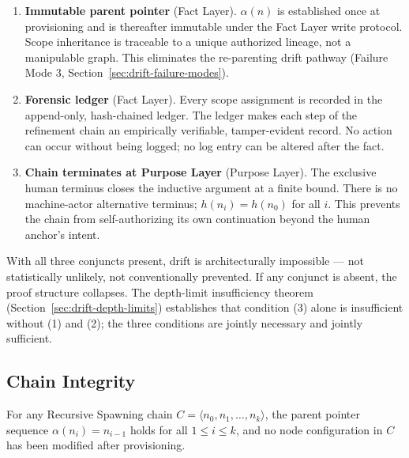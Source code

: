 \begin{enumerate}
    \item[(1)] \textbf{Immutable parent pointer} (Fact Layer). $\alpha(n)$ is established once at provisioning and is thereafter immutable under the Fact Layer write protocol. Scope inheritance is traceable to a unique authorized lineage, not a manipulable graph. This eliminates the re-parenting drift pathway (Failure Mode 3, Section~\ref{sec:drift-failure-modes}).

    \item[(2)] \textbf{Forensic ledger} (Fact Layer). Every scope assignment is recorded in the append-only, hash-chained ledger. The ledger makes each step of the refinement chain an empirically verifiable, tamper-evident record. No action can occur without being logged; no log entry can be altered after the fact.

    \item[(3)] \textbf{Chain terminates at Purpose Layer} (Purpose Layer). The exclusive human terminus closes the inductive argument at a finite bound. There is no machine-actor alternative terminus; $h(n_i) = h(n_0)$ for all $i$. This prevents the chain from self-authorizing its own continuation beyond the human anchor's intent.
\end{enumerate}

With all three conjuncts present, drift is architecturally impossible --- not statistically unlikely, not conventionally prevented. If any conjunct is absent, the proof structure collapses. The depth-limit insufficiency theorem (Section~\ref{sec:drift-depth-limits}) establishes that condition (3) alone is insufficient without (1) and (2); the three conditions are jointly necessary and jointly sufficient.

\subsection{Chain Integrity}
\label{sec:rs-chain-integrity}

\begin{thrm}
\label{thrm:chain-integrity}
For any Recursive Spawning chain $C = \langle n_0, n_1, \ldots, n_k \rangle$, the parent pointer sequence $\alpha(n_i) = n_{i-1}$ holds for all $1 \leq i \leq k$, and no node configuration in $C$ has been modified after provisioning.
\end{thrm}


